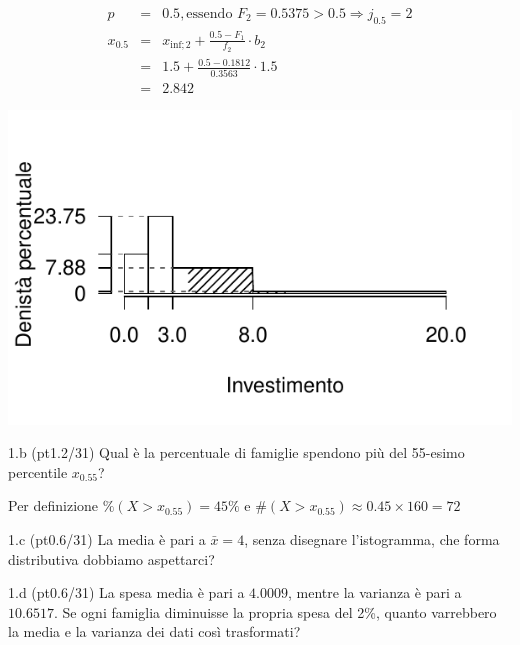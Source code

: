 \documentclass[
  10pt,
]{article}
\begin{document}
\begin{sol}

\begin{eqnarray*}
  p &=&  0.5 , \text{essendo }F_{ 2 }= 0.5375  > 0.5  \Rightarrow j_{ 0.5 }= 2 \\
  x_{ 0.5 } &=& x_{\text{inf}; 2 } + \frac{ { 0.5 } - F_{ 1 }} {f_{ 2 }} \cdot b_{ 2 } \\
            &=&  1.5  + \frac {{ 0.5 } -  0.1812 } { 0.3563 } \cdot  1.5  \\
            &=&  2.842 
\end{eqnarray*}

\begin{center}\includegraphics{www/compito_files/figure-latex/2024-95-1} \end{center}

\end{sol}

1.b (pt\hspace{.1em}1.2/31) Qual è la percentuale di famiglie spendono più del 55-esimo percentile \(x_{0.55}\)?

\begin{sol}
Per definizione \(\%(X>x_{0.55})=45\%\) e
\(\#(X>x_{0.55})\approx0.45\times160 =72\)

\end{sol}

1.c (pt\hspace{.1em}0.6/31) La media è pari a \(\bar x=4\), senza disegnare l'istogramma, che forma distributiva dobbiamo aspettarci?

1.d (pt\hspace{.1em}0.6/31) La spesa media è pari a \(4.0009\), mentre la varianza è pari a \(10.6517\).
Se ogni famiglia diminuisse la propria spesa del 2\%, quanto varrebbero la media e la varianza dei dati così trasformati?
\end{document}
